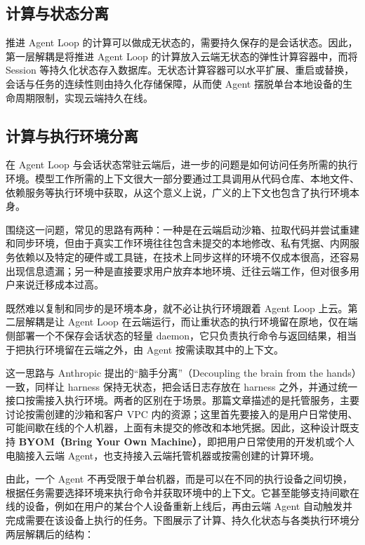 \documentclass[11pt,a4paper,UTF8,fontset=windows]{ctexart}
\begin{document}
\subsection{计算与状态分离}

推进 Agent Loop 的计算可以做成无状态的，需要持久保存的是会话状态。因此，第一层解耦是将推进 Agent Loop 的计算放入云端无状态的弹性计算容器中，而将 Session 等持久化状态存入数据库。无状态计算容器可以水平扩展、重启或替换，会话与任务的连续性则由持久化存储保障，从而使 Agent 摆脱单台本地设备的生命周期限制，实现云端持久在线。

\subsection{计算与执行环境分离}

在 Agent Loop 与会话状态常驻云端后，进一步的问题是如何访问任务所需的执行环境。模型工作所需的上下文很大一部分要通过工具调用从代码仓库、本地文件、依赖服务等执行环境中获取，从这个意义上说，广义的上下文也包含了执行环境本身。

围绕这一问题，常见的思路有两种：一种是在云端启动沙箱、拉取代码并尝试重建和同步环境，但由于真实工作环境往往包含未提交的本地修改、私有凭据、内网服务依赖以及特定的硬件或工具链，在技术上同步这样的环境不仅成本很高，还容易出现信息遗漏；另一种是直接要求用户放弃本地环境、迁往云端工作，但对很多用户来说迁移成本过高。

既然难以复制和同步的是环境本身，就不必让执行环境跟着 Agent Loop 上云。第二层解耦是让 Agent Loop 在云端运行，而让重状态的执行环境留在原地，仅在端侧部署一个不保存会话状态的轻量 daemon，它只负责执行命令与返回结果，相当于把执行环境留在云端之外，由 Agent 按需读取其中的上下文。

这一思路与 Anthropic 提出的“脑手分离”（Decoupling the brain from the hands）一致，同样让 harness 保持无状态，把会话日志存放在 harness 之外，并通过统一接口按需接入执行环境。两者的区别在于场景。那篇文章描述的是托管服务，主要讨论按需创建的沙箱和客户 VPC 内的资源；这里首先要接入的是用户日常使用、可能间歇在线的个人机器，上面有未提交的修改和本地凭据。因此，这种设计既支持 \textbf{BYOM（Bring Your Own Machine）}，即把用户日常使用的开发机或个人电脑接入云端 Agent，也支持接入云端托管机器或按需创建的计算环境。

由此，一个 Agent 不再受限于单台机器，而是可以在不同的执行设备之间切换，根据任务需要选择环境来执行命令并获取环境中的上下文。它甚至能够支持间歇在线的设备，例如在用户的某台个人设备重新上线后，再由云端 Agent 自动触发并完成需要在该设备上执行的任务。下图展示了计算、持久化状态与各类执行环境分两层解耦后的结构：
\end{document}
